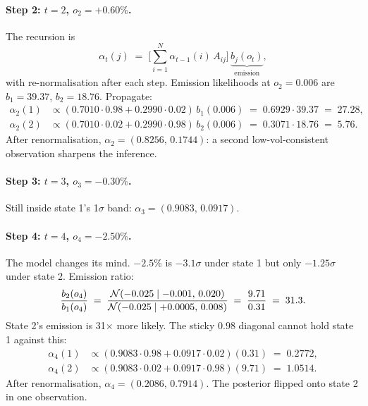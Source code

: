 \paragraph{Step 2: $t = 2$, $o_2 = +0.60\%$.} The recursion is
\begin{equation}
  \alpha_t(j)
  \;=\;
  \Big[\sum_{i=1}^{N} \alpha_{t-1}(i)\, A_{ij}\Big]\,
  \underbrace{b_j(o_t)}_{\text{emission}},
  \label{eq:wsw_hmm_recursion}
\end{equation}
with re-normalisation after each step. Emission likelihoods at
$o_2 = 0.006$ are $b_1 = 39.37$, $b_2 = 18.76$. Propagate:
\begin{align}
  \alpha_2(1)
  &\propto (0.7010\cdot 0.98 + 0.2990\cdot 0.02)\,b_1(0.006)
  \;=\; 0.6929 \cdot 39.37
  \;=\; 27.28,\\
  \alpha_2(2)
  &\propto (0.7010\cdot 0.02 + 0.2990\cdot 0.98)\,b_2(0.006)
  \;=\; 0.3071 \cdot 18.76
  \;=\; 5.76.
\end{align}
After renormalisation, $\alpha_2 = (0.8256,\, 0.1744)$: a second
low-vol-consistent observation sharpens the inference.

\paragraph{Step 3: $t = 3$, $o_3 = -0.30\%$.} Still inside state
1's 1$\sigma$ band: $\alpha_3 = (0.9083,\, 0.0917)$.

\paragraph{Step 4: $t = 4$, $o_4 = -2.50\%$.} The model changes its
mind. $-2.5\%$ is $-3.1\sigma$ under state 1 but only $-1.25\sigma$
under state 2. Emission ratio:
\begin{equation}
  \frac{b_2(o_4)}{b_1(o_4)}
  \;=\;
  \frac{\mathcal{N}(-0.025 \mid -0.001,\, 0.020)}
       {\mathcal{N}(-0.025 \mid +0.0005,\, 0.008)}
  \;=\; \frac{9.71}{0.31}
  \;=\; 31.3.
  \label{eq:wsw_hmm_flip}
\end{equation}
State 2's emission is 31$\times$ more likely. The sticky $0.98$
diagonal cannot hold state 1 against this:
\begin{align}
  \alpha_4(1)
  &\propto (0.9083\cdot 0.98 + 0.0917\cdot 0.02)(0.31)
  \;=\; 0.2772, \\
  \alpha_4(2)
  &\propto (0.9083\cdot 0.02 + 0.0917\cdot 0.98)(9.71)
  \;=\; 1.0514.
\end{align}
After renormalisation, $\alpha_4 = (0.2086,\, 0.7914)$. The posterior
flipped onto state 2 in one observation.

